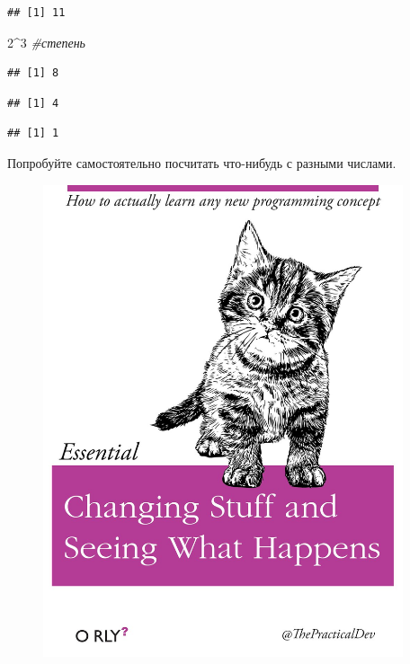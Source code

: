 \documentclass[]{book}
\newenvironment{Shaded}{\begin{snugshade}}{\end{snugshade}}
\newcommand{\DecValTok}[1]{\textcolor[rgb]{0.00,0.00,0.81}{#1}}
\newcommand{\StringTok}[1]{\textcolor[rgb]{0.31,0.60,0.02}{#1}}
\newcommand{\CommentTok}[1]{\textcolor[rgb]{0.56,0.35,0.01}{\textit{#1}}}
\newcommand{\OperatorTok}[1]{\textcolor[rgb]{0.81,0.36,0.00}{\textbf{#1}}}
\begin{document}
\begin{verbatim}
## [1] 11
\end{verbatim}

\begin{Shaded}
\begin{Highlighting}[]
\DecValTok{2}\OperatorTok{^}\DecValTok{3} \CommentTok{#степень}
\end{Highlighting}
\end{Shaded}

\begin{verbatim}
## [1] 8
\end{verbatim}

\begin{Shaded}
\end{Shaded}

\begin{verbatim}
## [1] 4
\end{verbatim}

\begin{Shaded}
\end{Shaded}

\begin{verbatim}
## [1] 1
\end{verbatim}

Попробуйте самостоятельно посчитать что-нибудь с разными числами.

\begin{figure}
\centering
\includegraphics[width=4.16667in]{images/ThePracticalDev_2016-Apr-13.jpg}
\caption{}
\end{figure}
\end{document}
